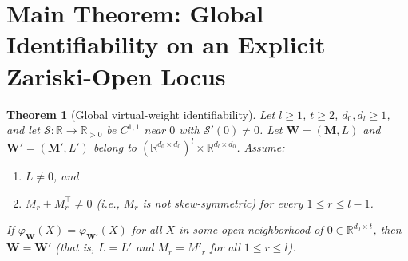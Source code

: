 \documentclass[11pt]{article}
\theoremstyle{plain}
\newtheorem{theorem}{Theorem}
\theoremstyle{definition}
\theoremstyle{remark}
\newcommand{\R}{\mathbb{R}}
\newcommand{\calS}{\mathcal{S}}
\newcommand{\bfW}{\mathbf{W}}
\newcommand{\bfM}{\mathbf{M}}
\begin{document}
\section{Main Theorem: Global Identifiability on an Explicit Zariski-Open Locus}

\begin{theorem}[Global virtual-weight identifiability]\label{thm:main}
Let $l \ge 1$, $t \ge 2$, $d_0, d_l \ge 1$, and let $\calS : \R \to \R_{>0}$ be $C^{1,1}$ near $0$ with $\calS'(0) \neq 0$. Let $\bfW = (\bfM, L)$ and $\bfW' = (\bfM', L')$ belong to $(\R^{d_0 \times d_0})^l \times \R^{d_l \times d_0}$. Assume:
\begin{enumerate}[leftmargin=2em,itemsep=1pt]
    \item $L \neq 0$, and
    \item $M_r + M_r^\top \neq 0$ (i.e., $M_r$ is not skew-symmetric) for every $1 \le r \le l - 1$.
\end{enumerate}
If $\varphi_{\bfW}(X) = \varphi_{\bfW'}(X)$ for all $X$ in some open neighborhood of $0 \in \R^{d_0 \times t}$, then $\bfW = \bfW'$ (that is, $L = L'$ and $M_r = M'_r$ for all $1 \le r \le l$).
\end{theorem}
\end{document}
